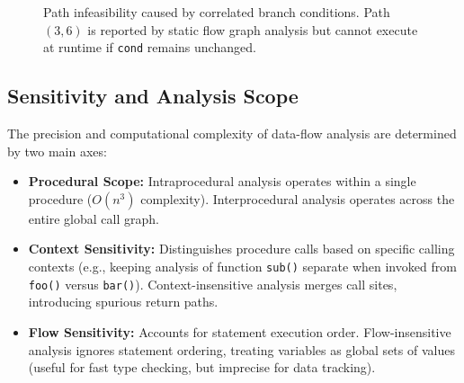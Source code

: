 \begin{figure}[htpb]
\centering
{}
\caption{Path infeasibility caused by correlated branch conditions. Path $(3, 6)$ is reported by static flow graph analysis but cannot execute at runtime if \texttt{cond} remains unchanged.}
\label{fig:path-infeasibility}
\end{figure}

\subsection{Sensitivity and Analysis Scope}
The precision and computational complexity of data-flow analysis are determined by two main axes:

\begin{itemize}
    \item \textbf{Procedural Scope:} Intraprocedural analysis operates within a single procedure ($O(n^3)$ complexity). Interprocedural analysis operates across the entire global call graph.
    \item \textbf{Context Sensitivity:} Distinguishes procedure calls based on specific calling contexts (e.g., keeping analysis of function \texttt{sub()} separate when invoked from \texttt{foo()} versus \texttt{bar()}). Context-insensitive analysis merges call sites, introducing spurious return paths.
    \item \textbf{Flow Sensitivity:} Accounts for statement execution order. Flow-insensitive analysis ignores statement ordering, treating variables as global sets of values (useful for fast type checking, but imprecise for data tracking).
\end{itemize}

